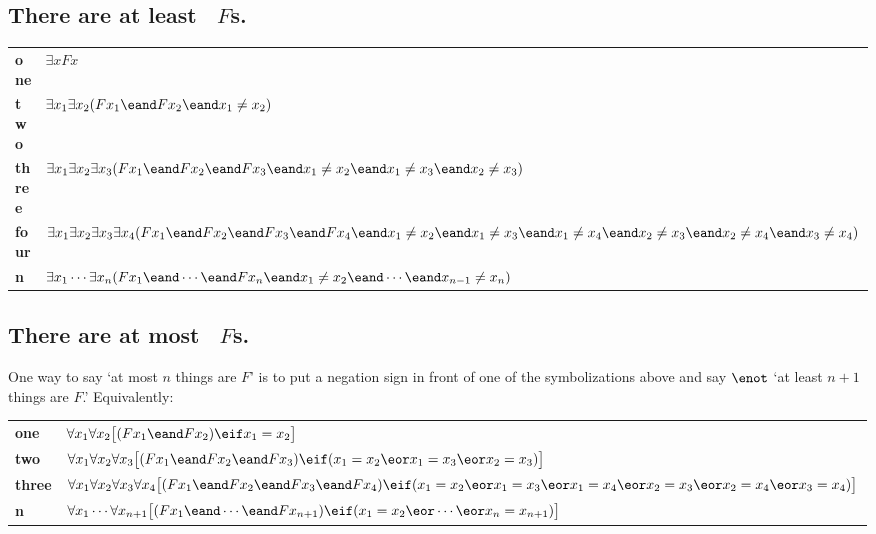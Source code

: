 \subsection*{There are at least \blank\ $F$s.}

\label{summary.atleast}
\begin{longtabu}{X[1,r]X[7,1]}
\textbf{one} & $\exists xFx$ \\

\textbf{two} & $\exists x_1\exists x_2(Fx_1 \eand Fx_2 \eand x_1 \neq x_2)$\\

\textbf{three} & $\exists x_1\exists x_2\exists x_3(Fx_1 \eand Fx_2 \eand Fx_3 \eand x_1 \neq x_2 \eand x_1 \neq x_3 \eand x_2 \neq x_3)$\\

\textbf{four} & $\exists x_1\exists x_2\exists x_3\exists x_4 (Fx_1 \eand Fx_2 \eand Fx_3 \eand Fx_4 \eand x_1 \neq x_2 \eand x_1 \neq x_3 \eand x_1 \neq x_4 \eand x_2 \neq x_3 \eand x_2 \neq x_4 \eand x_3 \neq x_4)$\\

\textbf{n} & $\exists x_1\cdots\exists x_n(Fx_1 \eand\cdots\eand Fx_n \eand x_1 \neq x_2 \eand\cdots\eand x_{n-1}\neq x_n)$ \\

\end{longtabu}


\subsection*{There are at most \blank\ $F$s.}
\label{summary.atmost}

One way to say `at most $n$ things are $F$' is to put a negation sign in front of one of the symbolizations above and say $\enot$ `at least $n+1$ things are $F$.' Equivalently:

\begin{longtabu}{X[1,r]X[7,1]}
\textbf{one} &  $\forall x_1\forall x_2\bigl[(Fx_1 \eand Fx_2) \eif x_1=x_2\bigr]$  \\
\vspace{6pt}  
\textbf{two}  & \vspace{3pt} $\forall x_1\forall x_2\forall x_3\bigl[(Fx_1 \eand Fx_2 \eand Fx_3) \eif (x_1=x_2 \eor x_1=x_3 \eor x_2=x_3)\bigr]$ \\

\textbf{three} & $\forall x_1\forall x_2\forall x_3\forall x_4\bigl[(Fx_1 \eand Fx_2 \eand Fx_3 \eand Fx_4) \eif (x_1=x_2 \eor x_1=x_3 \eor x_1=x_4 \eor x_2=x_3 \eor x_2=x_4 \eor x_3=x_4)\bigr]$ \\

\textbf{n} & $\forall x_1\cdots\forall x_{n+1}
\bigl[(Fx_1\eand \cdots \eand Fx_{n+1}) \eif (x_1=x_2 \eor \cdots \eor x_n=x_{n+1})\bigr]$ 
\end{longtabu}


